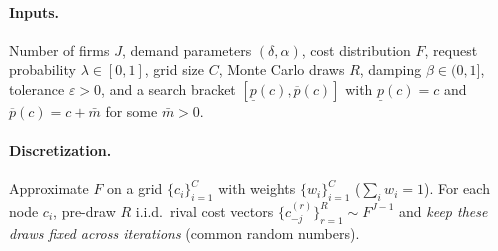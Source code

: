 \documentclass[12pt]{article}
\begin{document}
\paragraph{Inputs.} Number of firms $J$, demand parameters $(\delta,\alpha)$, cost distribution $F$,
request probability $\lambda\in[0,1]$, grid size $C$, Monte Carlo draws $R$, damping $\beta\in(0,1]$,
tolerance $\varepsilon>0$, and a search bracket $[\underline p(c), \overline p(c)]$ with
$\underline p(c)=c$ and $\overline p(c)=c+\bar m$ for some $\bar m>0$.

\paragraph{Discretization.} Approximate $F$ on a grid $\{c_i\}_{i=1}^C$ with weights
$\{w_i\}_{i=1}^C$ ($\sum_i w_i=1$). For each node $c_i$, pre-draw $R$ i.i.d.\ rival cost vectors
$\{c^{(r)}_{-j}\}_{r=1}^R \sim F^{J-1}$ and \emph{keep these draws fixed across iterations}
(common random numbers).

\vspace{3cm}
\end{document}
